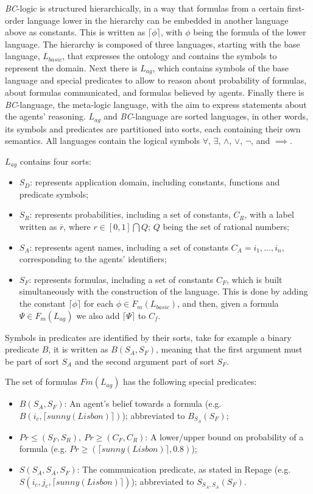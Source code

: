 \textit{BC}-logic is structured hierarchically, in a way that formulas from a certain first-order language lower in the hierarchy can be embedded in another language above as constants. This is written as $\lceil\phi\rceil$, with $\phi$ being the formula of the lower language.
The hierarchy is composed of three languages, starting with the base language, \textit{$L_{basic}$}, that expresses the ontology and contains the symbols to represent the domain. Next there is \textit{$L_{ag}$}, which contains symbols of the base language and special predicates to allow to reason about probability of formulas, about formulas communicated, and formulas believed by agents. Finally there is \textit{BC}-language, the meta-logic language, with the aim to express statements about the agents' reasoning. \textit{$L_{ag}$} and \textit{BC}-language are sorted languages, in other words, its symbols and predicates are partitioned into sorts, each containing their own semantics. All languages contain the logical symbols $\forall$, $\exists$, $\wedge$, $\vee$, $\neg$, and $\implies$.

\textit{$L_{ag}$} contains four sorts:
\begin{itemize}
    \item $S_D$: represents application domain, including constants, functions and predicate symbols;
    \item $S_R$: represents probabilities, including a set of constants, $C_R$, with a label written as $\overline{r}$, where $r \in [0,1]\bigcap Q$; $Q$ being the set of rational numbers;
    \item $S_A$: represents agent names, including a set of constants $C_A = {i_1, ..., i_n}$, corresponding to the agents' identifiers;
    \item $S_F$: represents formulas, including a set of constants $C_F$, which is built simultaneously with the construction of the language. This is done by adding the constant $\lceil\phi\rceil$ for each $\phi \in F_m(L_{basic})$, and then, given a formula $\Psi \in F_m(L_{ag})$ we also add $\lceil\Psi\rceil$ to $C_f$.
\end{itemize}

Symbols in predicates are identified by their sorts, take for example a binary predicate $B$, it is written as $B(S_A, S_F)$, meaning that the first argument must be part of sort $S_A$ and the second argument part of sort $S_F$.

The set of formulas $Fm(L_{ag})$ has the following special predicates:
\begin{itemize}
    \item $B(S_A, S_F)$: An agent's belief towards a formula (e.g. $B(i_c, \lceil sunny(Lisbon)\rceil)$); abbreviated to $B_{S_A}(S_F)$;
    \item $Pr\leq(S_F, S_R),\ Pr\geq(C_F, C_R)$: A lower/upper bound on probability of a formula (e.g. $Pr\geq(\lceil sunny(Lisbon)\rceil, 0.8)$);
    \item $S(S_A, S_A, S_F)$: The communication predicate, as stated in Repage (e.g. $S(i_c, j_c, \lceil sunny(Lisbon)\rceil)$);
    abbreviated to $S_{S_A, S_A}(S_F)$.
\end{itemize}


